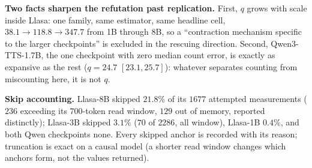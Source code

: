 \noindent\textbf{Two facts sharpen the refutation past replication.}
First, $q$ grows with scale inside Llasa: one family, same estimator,
same headline cell, $38.1 \to 118.8 \to 347.7$ from 1B through 8B, so a
``contraction mechanism specific to the larger checkpoints'' is
excluded in the rescuing direction. Second, Qwen3-TTS-1.7B, the one
checkpoint with zero median count error, is exactly as expansive as the
rest ($q = 24.7$ $[23.1, 25.7]$): whatever separates counting from
miscounting here, it is not $q$.

\noindent\textbf{Skip accounting.} Llasa-8B skipped $21.8\%$ of its
$1677$ attempted measurements ($236$ exceeding its $700$-token read
window, $129$ out of memory, reported distinctly); Llasa-3B skipped
$3.1\%$ ($70$ of $2286$, all window), Llasa-1B $0.4\%$, and both Qwen
checkpoints none. Every skipped anchor is recorded with its reason;
truncation is exact on a causal model (a shorter read window changes
which anchors form, not the values returned).

